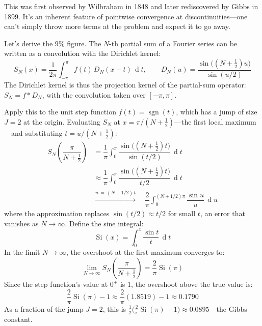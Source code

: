 \documentclass[12pt,a4paper]{report}
\DeclareMathOperator{\deriv}{d}
\theoremstyle{thms}
\theoremstyle{defns}
\begin{document}
This was first observed by Wilbraham in 1848 and later rediscovered by Gibbs in 1899. It's an inherent feature of pointwise convergence at discontinuities—one can't simply throw more terms at the problem and expect it to go away.

Let's derive the $9\%$ figure. The $N$-th partial sum of a Fourier series can be written as a convolution with the Dirichlet kernel:
\begin{equation}
    S_N(x) = \dfrac{1}{2\pi}\int_{-\pi}^{\pi} f(t)\,D_N(x - t)\,\deriv{t}, \qquad D_N(u) = \dfrac{\sin\bigl((N + \tfrac{1}{2})u\bigr)}{\sin(u/2)}
\end{equation}
The Dirichlet kernel is thus the projection kernel of the partial-sum operator: $S_N = f * D_N$, with the convolution taken over $[-\pi, \pi]$.

Apply this to the unit step function $f(t) = \operatorname{sgn}(t)$, which has a jump of size $J = 2$ at the origin. Evaluating $S_N$ at $x = \pi/(N + \tfrac{1}{2})$—the first local maximum—and substituting $t = u/(N + \tfrac{1}{2})$:
\begin{align}
    S_N\!\left(\dfrac{\pi}{N + \tfrac{1}{2}}\right)
    &= \dfrac{1}{\pi}\int_0^{\pi} \dfrac{\sin\bigl((N + \tfrac{1}{2})t\bigr)}{\sin(t/2)}\,\deriv{t} \\
    &\approx \dfrac{1}{\pi}\int_0^{\pi} \dfrac{\sin\bigl((N + \tfrac{1}{2})t\bigr)}{t/2}\,\deriv{t} \\
    &\xrightarrow{u\,=\,(N + 1/2)\,t}\quad \dfrac{2}{\pi}\int_0^{(N+1/2)\pi} \dfrac{\sin u}{u}\,\deriv{u}
\end{align}
where the approximation replaces $\sin(t/2) \approx t/2$ for small $t$, an error that vanishes as $N \to \infty$. Define the sine integral:
\begin{equation}
    \operatorname{Si}(x) = \int_0^x \dfrac{\sin t}{t}\,\deriv{t}
\end{equation}
In the limit $N \to \infty$, the overshoot at the first maximum converges to:
\begin{equation}
    \lim_{N \to \infty} S_N\!\left(\dfrac{\pi}{N + \tfrac{1}{2}}\right) = \dfrac{2}{\pi}\operatorname{Si}(\pi)
\end{equation}
Since the step function's value at $0^+$ is $1$, the overshoot above the true value is:
\begin{equation}
    \dfrac{2}{\pi}\operatorname{Si}(\pi) - 1 \approx \dfrac{2}{\pi}(1.8519) - 1 \approx 0.1790
\end{equation}
As a fraction of the jump $J = 2$, this is $\tfrac{1}{2}\bigl(\tfrac{2}{\pi}\operatorname{Si}(\pi) - 1\bigr) \approx 0.0895$—the Gibbs constant.
\end{document}
